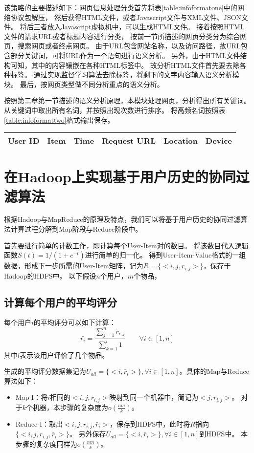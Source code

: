 该策略的主要描述如下：网页信息处理分类首先将表\ref{table:infoformatone}中的网络协议包解压，
然后获得HTML文件，或者Javascript文件与XML文件、JSON文件。
将后三者放入Javascript虚拟机中，可以生成HTML文件。
接着按照HTML文件的请求URL或者标题内容进行分类，
按前一节所描述的网页分类分为综合网页，搜索网页或者终点网页。
由于URL包含网站名称，以及访问路径，故URL包含部分关键词，可将URL作为一个语句进行语义分析。
另外，由于HTML文件结构可知，其中的内容镶嵌在各种HTML标签中。
故分析HTML文件首先要去除各种标签。
通过实现监督学习算法\supercite{Kohlsch2010Boilerplate}去除标签，将剩下的文字内容输入语义分析模块。
最后，按网页类型做不同分析重点的语义分析。

按照第二章第一节描述的语义分析原理，本模块处理网页，分析得出所有关键词。
从关键词中取出所有名词，并按照出现次数进行排序。
将高频名词按照表\ref{table:infoformattwo}格式输出保存。
\begin{center}
\label{table:infoformattwo}
\begin{tabular}{c|c|c|c|c|c}
	\hline
	User ID & Item & Time & Request URL & Location & Device \\
	\hline
\end{tabular}
\end{center}

\section{在Hadoop上实现基于用户历史的协同过滤算法}
根据Hadoop与MapReduce的原理及特点，我们可以将基于用户历史的协同过滤算法计算过程分解到Map阶段与Reduce阶段中。

首先要进行简单的计数工作，即计算每个User-Item对的数目。
将该数目代入逻辑函数$S(t)=1/(1+e^{-t})$进行简单的归一化。
得到User-Item-Value格式的一组数据，形成下一步所需的User-Item矩阵，记为$R=\{<i,j,r_{i,j}>\}$，保存于Hadoop的HDFS中。
以下假设$n$个用户，$m$个物品，

\subsection{计算每个用户的平均评分}
每个用户$i$的平均评分可以如下计算：
\begin{equation}
\bar{r_i} = \frac{\sum_{j=1}^n r_{i,j}}{\sum_{k=1}^l 1}\qquad \forall i\in [1,n]
\end{equation}
其中$l$表示该用户评价了几个物品。

生成的平均评分数据集记为$U_{all}=\{<i,\bar{r}_i>\},\forall i\in [1,n]$。具体的Map与Reduce算法如下：
\begin{itemize}
\item Map-I：将$i$相同的$<i,j,r_{i,j}>$映射到同一个机器中，简记为$<j,r_{i,j}>$。
对于$k$个机器，本步骤的复杂度为$o(\frac{nm}{k})$。
\item Reduce-I：取出$<i,j,r_{i,j},\bar{r}_i>$，保存到HDFS中，此时将$R$指向$\{<i,j,r_{i,j},\bar{r}_i>\}$。
另外保存$U_{all}=\{<i,\bar{r}_i>\},\forall i\in [1,n]$到HDFS中。
本步骤的复杂度同样为$o(\frac{nm}{k})$。
\end{itemize}

